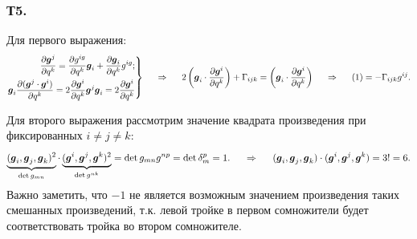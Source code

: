 \subsubsection*{Т5.}
Для первого выражения:
\begin{equation}
    \left.\begin{aligned}
        \frac{\partial \mbox{\boldmath $g$}^j}{\partial q^k} = \frac{\partial g^{ig}}{\partial q^k} \mbox{\boldmath $g$}_i + \frac{\partial \mbox{\boldmath $g$}_i}{\partial q^k} g^{ig}; \\ 
        \mbox{\boldmath $g$}_i \frac{\partial (\mbox{\boldmath $g$}^j \cdot \mbox{\boldmath $g$}^i)}{\partial q^k} = 2 \frac{\partial \mbox{\boldmath $g$}^i}{\partial q^k} \mbox{\boldmath $g$}^j \mbox{\boldmath $g$}_i = 
        2 \frac{\partial \mbox{\boldmath $g$}^i}{\partial q^k}
    \end{aligned}\right\}
    \hspace{0.5cm} \Rightarrow \hspace{0.5cm} 
    2 \left(\mbox{\boldmath $g$}_i \cdot \frac{\partial \mbox{\boldmath $g$}^i}{\partial q^k} \right) + \Gamma_{ijk} = \left(\mbox{\boldmath $g$}_i  \cdot \frac{\partial \mbox{\boldmath $g$}^i}{\partial q^k} \right)
    \hspace{0.5cm} \Rightarrow \hspace{0.5cm} 
    (1) = - \Gamma_{ijk} g^{ij}.
\end{equation}

Для второго выражения рассмотрим значение квадрата произведения при фиксированных $i \neq j \neq k$:
$$
    \underbrace{(\mbox{\boldmath $g$}_i, \mbox{\boldmath $g$}_j, \mbox{\boldmath $g$}_k)^2}_{\det g_{mn}} \cdot 
    \underbrace{(\mbox{\boldmath $g$}^i, \mbox{\boldmath $g$}^j, \mbox{\boldmath $g$}^k)^2}_{\det g^{nk}} = \det g_{mn} g^{np} = \det \delta_m^p = 1.
    \hspace{0.5cm} \Rightarrow \hspace{0.5cm} 
    (\mbox{\boldmath $g$}_i, \mbox{\boldmath $g$}_j, \mbox{\boldmath $g$}_k) \cdot (\mbox{\boldmath $g$}^i, \mbox{\boldmath $g$}^j, \mbox{\boldmath $g$}^k) = 3! = 6.
$$
Важно заметить, что $-1$ не является возможным значением произведения таких смешанных произведений, т.к. левой тройке в первом сомножители будет соответствовать тройка во втором сомножителе.
